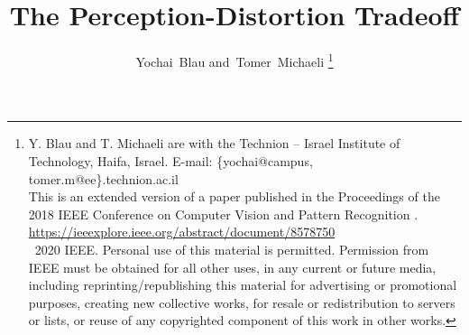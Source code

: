 \documentclass[10pt,journal,compsoc]{IEEEtran}
\begin{document}
\title{The Perception-Distortion Tradeoff}

\author{Yochai~Blau
        and~Tomer~Michaeli%
\thanks{
Y. Blau and T. Michaeli are with the Technion -- Israel Institute of Technology, Haifa, Israel. E-mail: \{yochai@campus, tomer.m@ee\}.technion.ac.il \protect\\

\noindent This is an extended version of a paper published in the Proceedings of the 2018 IEEE Conference on Computer Vision and Pattern Recognition \cite{blau2018perception}. \protect\\
\url{https://ieeexplore.ieee.org/abstract/document/8578750} \protect\\
	
\noindent \scriptsize{\textcopyright \, 2020 IEEE. Personal use of this material is permitted. Permission from IEEE must be obtained for all other uses, in any current or future media, including reprinting/republishing this material for advertising or promotional purposes, creating new collective works, for resale or redistribution to servers or lists, or reuse of any copyrighted component of this work in other works.}}
}

\IEEEtitleabstractindextext{%
\begin{abstract}

\end{abstract}
}

\maketitle
{}












\end{document}

